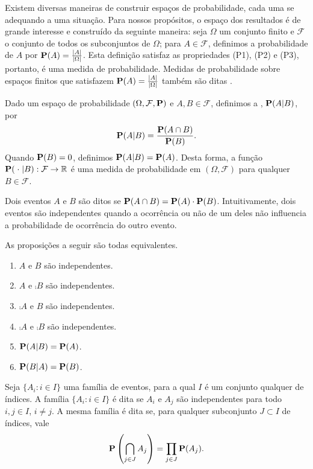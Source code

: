 Existem diversas maneiras de construir espaços de probabilidade, cada uma se adequando a uma situação. Para nossos propósitos, o espaço dos resultados  é de grande interesse e construído da seguinte maneira:
seja $\Omega$ um conjunto finito e $\mathcal{F}$ o conjunto de todos os subconjuntos de $\Omega$; para $A \in \mathcal{F}$, definimos a probabilidade de $A$ por $\operatorname{\mathbf{P}}(A) = \frac{\left | A \right |}{\left | \Omega \right |}$. Esta definição satisfaz as propriedades (P1), (P2) e (P3), portanto, é uma medida de probabilidade. Medidas de probabilidade sobre espaços finitos que satisfazem $\operatorname{\mathbf{P}}(A) = \frac{\left | A \right |}{\left | \Omega \right |}$ também são ditas .

Dado um espaço de probabilidade $(\Omega, \mathcal{F}, \operatorname{\mathbf{P}})$ e $A, B \in \mathcal{F}$, definimos a , $\operatorname{\mathbf{P}}(A | B)$, por
\[ \operatorname{\mathbf{P}}(A|B) = \frac{\operatorname{\mathbf{P}}(A \cap B)}{\operatorname{\mathbf{P}}(B)}. \]
Quando $\operatorname{\mathbf{P}}(B) = 0$, definimos $\operatorname{\mathbf{P}}(A|B) = \operatorname{\mathbf{P}}(A)$. Desta forma, a função $\operatorname{\mathbf{P}}(\; \cdot \;| B) : \mathcal{F} \to \mathbb{R}$ é uma medida de probabilidade em $(\Omega, \mathcal{F})$ para qualquer $B \in \mathcal{F}$.

Dois eventos $A$ e $B$ são ditos  se $\operatorname{\mathbf{P}}(A \cap B) = \operatorname{\mathbf{P}}(A) \cdot \operatorname{\mathbf{P}}(B)$. Intuitivamente, dois eventos são independentes quando a ocorrência ou não de um deles não influencia a probabilidade de ocorrência do outro evento.

As proposições a seguir são todas equivalentes.
\begin{enumerate}[label=\arabic*.,itemindent=*]
  \item $A$ e $B$ são independentes.
  \item $A$ e $\comp{B}$ são independentes.
  \item $\comp{A}$ e $B$ são independentes.
  \item $\comp{A}$ e $\comp{B}$ são independentes.
  \item $\operatorname{\mathbf{P}}(A|B) = \operatorname{\mathbf{P}}(A)$.
  \item $\operatorname{\mathbf{P}}(B|A) = \operatorname{\mathbf{P}}(B)$.
\end{enumerate}

Seja $\{ A_i : i \in I\}$ uma família de eventos, para a qual $I$ é um conjunto qualquer de índices. A família $\{ A_i : i \in I\}$ é dita  se $A_i$ e $A_j$ são independentes para todo $i,j \in I$, $i \neq j$. A mesma família é dita  se, para qualquer subconjunto $J \subset I$ de índices, vale
\[ \operatorname{\mathbf{P}}\left(\bigcap_{j \in J} A_j \right) = \prod_{j \in J}\operatorname{\mathbf{P}}(A_j).\]


